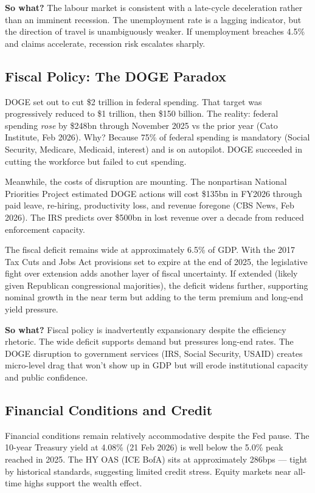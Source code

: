 \documentclass{wilson-report}
\begin{document}
\textbf{So what?} The labour market is consistent with a late-cycle deceleration rather than an imminent recession. The unemployment rate is a lagging indicator, but the direction of travel is unambiguously weaker. If unemployment breaches 4.5\% and claims accelerate, recession risk escalates sharply.

\subsection{Fiscal Policy: The DOGE Paradox}

DOGE set out to cut \$2 trillion in federal spending. That target was progressively reduced to \$1 trillion, then \$150 billion. The reality: federal spending \textit{rose} by \$248bn through November 2025 vs the prior year (Cato Institute, Feb 2026). Why? Because 75\% of federal spending is mandatory (Social Security, Medicare, Medicaid, interest) and is on autopilot. DOGE succeeded in cutting the workforce but failed to cut spending.

Meanwhile, the costs of disruption are mounting. The nonpartisan National Priorities Project estimated DOGE actions will cost \$135bn in FY2026 through paid leave, re-hiring, productivity loss, and revenue foregone (CBS News, Feb 2026). The IRS predicts over \$500bn in lost revenue over a decade from reduced enforcement capacity.

The fiscal deficit remains wide at approximately 6.5\% of GDP. With the 2017 Tax Cuts and Jobs Act provisions set to expire at the end of 2025, the legislative fight over extension adds another layer of fiscal uncertainty. If extended (likely given Republican congressional majorities), the deficit widens further, supporting nominal growth in the near term but adding to the term premium and long-end yield pressure.

\textbf{So what?} Fiscal policy is inadvertently expansionary despite the efficiency rhetoric. The wide deficit supports demand but pressures long-end rates. The DOGE disruption to government services (IRS, Social Security, USAID) creates micro-level drag that won't show up in GDP but will erode institutional capacity and public confidence.

\subsection{Financial Conditions and Credit}

Financial conditions remain relatively accommodative despite the Fed pause. The 10-year Treasury yield at 4.08\% (21 Feb 2026) is well below the 5.0\% peak reached in 2025. The HY OAS (ICE BofA) sits at approximately 286bps --- tight by historical standards, suggesting limited credit stress. Equity markets near all-time highs support the wealth effect.
\end{document}
